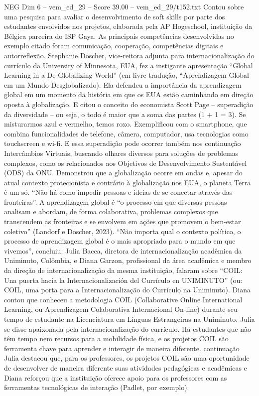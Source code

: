 \begin{textsample}{NEG Dim 6 – vem\_ed\_29 – Score 39.00 – vem\_ed\_29/t152.txt}
Contou sobre uma pesquisa para avaliar o desenvolvimento de soft skills por parte dos estudantes envolvidos nos projetos, elaborada pela AP Hogeschool, instituição da Bélgica parceira do ISP Gaya.
As principais competências desenvolvidas no exemplo citado foram comunicação, cooperação, competências digitais e autorreflexão.
Stephanie Doscher, vice-reitora adjunta para internacionalização do currículo da University of Minnesota, EUA, fez a instigante apresentação “Global Learning in a De-Globalizing World” (em livre tradução, “Aprendizagem Global em um Mundo Desglobalizado).
Ela defendeu a importância da aprendizagem global em um momento da história em que os EUA estão caminhando em direção oposta à globalização.
E citou o conceito do economista Scott Page – superadição da diversidade – ou seja, o todo é maior que a soma das partes (1 + 1 = 3).
Se misturarmos azul e vermelho, temos roxo.
Exemplificou com o smartphone, que combina funcionalidades de telefone, câmera, computador, usa tecnologias como touchscreen e wi-fi.
E essa superadição pode ocorrer também nos continuação Intercâmbios Virtuais, buscando olhares diversos para soluções de problemas complexos, como os relacionados aos Objetivos de Desenvolvimento Sustentável (ODS) da ONU.
Demonstrou que a globalização ocorre em ondas e, apesar do atual contexto protecionista e contrário à globalização nos EUA, o planeta Terra é um só. “Não há como impedir pessoas e ideias de se conectar através das fronteiras”.
A aprendizagem global é “o processo em que diversas pessoas analisam e abordam, de forma colaborativa, problemas complexos que transcendem as fronteiras e se envolvem em ações que promovem o bem-estar coletivo” (Landorf e Doscher, 2023). “Não importa qual o contexto político, o processo de aprendizagem global é o mais apropriado para o mundo em que vivemos”, concluiu.
Julia Bacca, diretora de internacionalização acadêmica da Uniminuto, Colômbia, e Diana Garzon, profissional da área acadêmica e membro da direção de internacionalização da mesma instituição, falaram sobre “COIL: Una puerta hacia la Internacionalización del Currículo en UNIMINUTO” (ou: COIL, uma porta para a Internacionalização do Currículo na Uniminuto).
Diana contou que conheceu a metodologia COIL (Collaborative Online International Learning, ou Aprendizagem Colaborativa Internacional On-line) durante seu tempo de estudante na Licenciatura em Línguas Estrangeiras na Uniminuto.
Julia se disse apaixonada pela internacionalização do currículo.
Há estudantes que não têm tempo nem recursos para a mobilidade física, e os projetos COIL são ferramenta chave para aprender e interagir de maneira diferente. continuação Julia destacou que, para os professores, os projetos COIL são uma oportunidade de desenvolver de maneira diferente suas atividades pedagógicas e acadêmicas e Diana reforçou que a instituição oferece apoio para os professores com as ferramentas tecnológicas de interação (Padlet, por exemplo).

\end{textsample}
